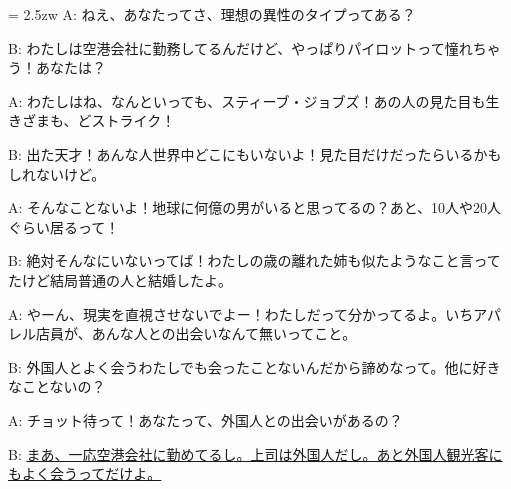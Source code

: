 \documentclass[11pt]{amsart}
\title{}
\author{}
\newenvironment{hangall}[1]{\hangindent = 2.5zw\everypar{\hangindent = 2.5zw}}{}
\begin{document}
\maketitle
\begin{hangall}{}%
A: ねえ、あなたってさ、理想の異性のタイプってある？

B: わたしは空港会社に勤務してるんだけど、やっぱりパイロットって憧れちゃう！あなたは？

A: わたしはね、なんといっても、スティーブ・ジョブズ！あの人の見た目も生きざまも、どストライク！

B: 出た天才！あんな人世界中どこにもいないよ！見た目だけだったらいるかもしれないけど。

A: そんなことないよ！地球に何億の男がいると思ってるの？あと、10人や20人ぐらい居るって！

B: 絶対そんなにいないってば！わたしの歳の離れた姉も似たようなこと言ってたけど結局普通の人と結婚したよ。

A: やーん、現実を直視させないでよー！わたしだって分かってるよ。いちアパレル店員が、あんな人との出会いなんて無いってこと。

B: 外国人とよく会うわたしでも会ったことないんだから諦めなって。他に好きなことないの？

A: チョット待って！あなたって、外国人との出会いがあるの？

B: \ul{まあ、一応空港会社に勤めてるし。上司は外国人だし。あと外国人観光客にもよく会うってだけよ。}\end{hangall}
\end{document}
